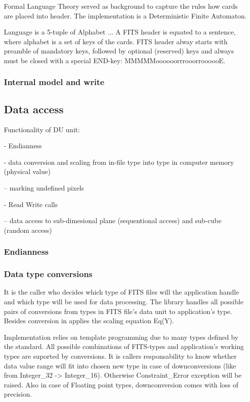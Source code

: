 \documentclass[a4paper,10pt]{article}
\begin{document}
Formal Language Theory served as background to capture the rules how cards are placed 
into header. The implementation is a Deterministic Finite Automaton.

Language is a 5-tuple of Alphabet ...
A FITS header is equated to a sentence, where alphabet is a set of keys of the cards.
FITS header alway starts with preamble of mandatory keys, followed by optional (reserved) keys
and always must be closed with a special END-key: MMMMMoooooorrrooorroooooE.


\subsubsection{Internal model and write}



\subsection{Data access}

Functionality of DU unit:

- Endianness

- data conversion and scaling from in-file type into type in computer memory (physical value)

-- marking undefined pixels

- Read Write calls

-- data access to sub-dimesional plane (sequentional access) and sub-cube (random access)



\subsubsection{Endianness}

\subsubsection{Data type conversions}

It is the caller who decides which type of FITS files will the application handle and
which type will be used for data processing. The library handles all possible pairs of
conversions from types in FITS file's data unit to application's type.
Besides conversion in applies the scaling equation Eq(Y).

Implementation relies on template programming due to many types defined by the standard. 
All possible combinations of FITS-types and application's working types are suported
by conversions. It is callers responsability to know whether data value range will fit
into chosen new type in case of downconversions (like from Integer\_32 -> Integer\_16).
Otherwise Constraint\_Error exception will be raised.
Also in case of Floating point types, downconversion comes with loss of precision.
\end{document}
